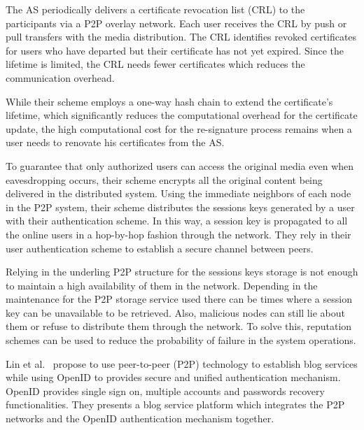 The AS periodically delivers a certificate revocation list (CRL) to the
participants via a P2P overlay network. Each user receives the CRL by push or
pull transfers with the media distribution. The CRL identifies revoked
certificates for users who have departed but their certificate
 has not yet expired. Since the lifetime is limited, the
CRL needs fewer certificates which reduces the
communication overhead.

While their scheme employs a one-way hash chain to extend the
certificate’s lifetime, which significantly reduces
the computational overhead for the certificate update, the high computational cost
for the re-signature process remains when
a user needs to renovate his certificates from the AS. 

To guarantee that only authorized users can access the
original media even when eavesdropping occurs, their scheme encrypts all the 
original content being delivered in the distributed system.
Using the immediate neighbors of each node in the P2P system,
their scheme distributes the sessions keys generated by a user with their
authentication scheme.
In this way, a session key is propagated to
all the online users in a hop-by-hop fashion through the network. They rely in their user authentication scheme to establish a secure channel
between peers. 

Relying in the underling P2P structure for the sessions keys storage is
not enough to maintain a high availability of them in the network. Depending in
the maintenance for the P2P storage service used there can be times where a
session key can be unavailable to be retrieved. Also, malicious
nodes can still lie about them or refuse to distribute them through the
network. To solve this, reputation schemes can be used to reduce the
probability of failure in the system operations.


Lin et al.~\cite{lin2008p2p} propose to use peer-to-peer (P2P) technology to
establish blog services while using OpenID to provides secure and unified
authentication mechanism. OpenID provides single sign on, multiple accounts and
passwords recovery functionalities. They presents a blog service platform which integrates the P2P networks and the
OpenID authentication mechanism together.





